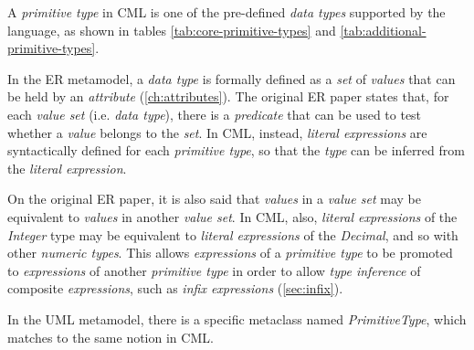 A \emph{primitive type} in CML is one of the pre-defined \emph{data types}
supported by the language,
as shown in tables \ref{tab:core-primitive-types} and \ref{tab:additional-primitive-types}.

In the ER \cite{er} metamodel,
a \emph{data type} is formally defined as a \emph{set} of \emph{values}
that can be held by an \emph{attribute} (\ref{ch:attributes}).
The original ER paper \cite{er} states that,
for each \emph{value set} (i.e. \emph{data type}),
there is a \emph{predicate} that can be used to test
whether a \emph{value} belongs to the \emph{set}.
In CML, instead,
\emph{literal expressions} are syntactically defined for each \emph{primitive type},
so that the \emph{type} can be inferred from the \emph{literal expression}.

On the original ER paper,
it is also said that \emph{values} in a \emph{value set}
may be equivalent to \emph{values} in another \emph{value set}.
In CML, also,
\emph{literal expressions} of the \emph{Integer} type may be equivalent 
to \emph{literal expressions} of the \emph{Decimal},
and so with other \emph{numeric types}.
This allows \emph{expressions} of a \emph{primitive type}
to be promoted to \emph{expressions} of another \emph{primitive type}
in order to allow \emph{type inference} of composite \emph{expressions},
such as \emph{infix expressions} (\ref{sec:infix}).

In the UML \cite{uml} metamodel,
there is a specific metaclass named \emph{PrimitiveType},
which matches to the same notion in CML.

